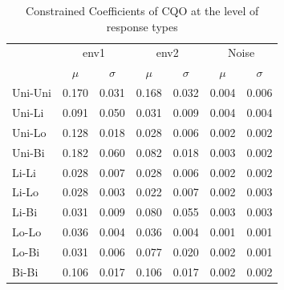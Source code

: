 			\begin{table}[h!] 
				
				\normalsize
				\caption{Constrained Coefficients of CQO at the level of response types}
				\centering
				
				\begin{tabular}{@{}lcccccc@{}}
					
					\toprule
					& \multicolumn{2}{c}{env1} & \multicolumn{2}{c}{env2} & \multicolumn{2}{c}{Noise}\\\cmidrule(l){2-3} \cmidrule(l){4-5} \cmidrule(l){6-7}
					& $\mu$ & $\sigma$ & $\mu$ & $\sigma$ & $\mu$ & $\sigma$\\
					\hline
					Uni-Uni  & 0.170 & 0.031 & 0.168 & 0.032 & 0.004 & 0.006 \\
					Uni-Li   & 0.091 & 0.050 & 0.031 & 0.009 & 0.004 & 0.004 \\
					Uni-Lo   & 0.128 & 0.018 & 0.028 & 0.006 & 0.002 & 0.002 \\
					Uni-Bi   & 0.182 & 0.060 & 0.082 & 0.018 & 0.003 & 0.002 \\
					Li-Li    & 0.028 & 0.007 & 0.028 & 0.006 & 0.002 & 0.002 \\
					Li-Lo    & 0.028 & 0.003 & 0.022 & 0.007 & 0.002 & 0.003 \\
					Li-Bi    & 0.031 & 0.009 & 0.080 & 0.055 & 0.003 & 0.003 \\
					Lo-Lo    & 0.036 & 0.004 & 0.036 & 0.004 & 0.001 & 0.001 \\
					Lo-Bi    & 0.031 & 0.006 & 0.077 & 0.020 & 0.002 & 0.001 \\
					Bi-Bi    & 0.106 & 0.017 & 0.106 & 0.017 & 0.002 & 0.002 \\
					\toprule
				\end{tabular}
			
				\label{tab:cqosm1}
			
			\end{table}
			
